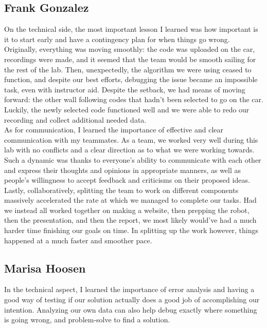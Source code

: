 \documentclass{article}
\begin{document}
\subsection{Frank Gonzalez}
On the technical side, the most important lesson I learned was how important is it to start early and have a contingency plan for when things go wrong. Originally, everything was moving smoothly: the code was uploaded on the car, recordings were made, and it seemed that the team would be smooth sailing for the rest of the lab. Then, unexpectedly, the algorithm we were using ceased to function, and despite our best efforts, debugging the issue became an impossible task, even with instructor aid. Despite the setback, we had means of moving forward: the other wall following codes that hadn't been selected to go on the car. Luckily, the newly selected code functioned well and we were able to redo our recording and collect additional needed data.\\

As for communication, I learned the importance of effective and clear communication with my teammates. As a team, we worked very well during this lab with no conflicts and a clear direction as to what we were working towards. Such a dynamic was thanks to everyone's ability to communicate with each other and express their thoughts and opinions in appropriate manners, as well as people's willingness to accept feedback and criticisms on their proposed ideas. \\

Lastly, collaboratively, splitting the team to work on different components massively accelerated the rate at which we managed to complete our tasks. Had we instead all worked together on making a website, then prepping the robot, then the presentation, and then the report, we most likely would've had a much harder time finishing our goals on time. In splitting up the work however, things happened at a much faster and smoother pace. \\

\subsection{Marisa Hoosen}
In the technical aspect, I learned the importance of error analysis and having a good way of testing if our solution actually does a good job of accomplishing our intention. Analyzing our own data can also help debug exactly where something is going wrong, and problem-solve to find a solution. \\
\end{document}
